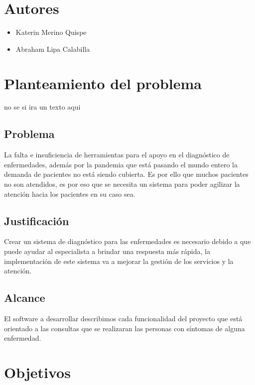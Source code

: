 \documentclass[preprint,12pt]{elsarticle}
\begin{document}
\section{Autores}
\begin{itemize}
    \item Katerin Merino Quispe
    \item Abraham Lipa Calabilla
    
\end{itemize}
\section{Planteamiento del problema}
no se si ira un texto aqui

	\subsection{\textbf{Problema}}
 La falta e insuficiencia de herramientas para el apoyo en el diagnóstico de enfermedades, además por la pandemia que está pasando el mundo entero la demanda de pacientes no está siendo cubierta. Es por ello que muchos pacientes no son atendidos, es por eso que se necesita un sistema para poder agilizar la atención hacia los pacientes en su caso sea.
	\subsection{\textbf{Justificación }}
Crear un sistema de diagnóstico para las enfermedades es necesario debido a que puede ayudar al especialista a brindar una respuesta más rápida, la implementación de este sistema va a mejorar la gestión de los servicios y la atención.

	\subsection{\textbf{ Alcance }}
El software a desarrollar describimos cada funcionalidad del proyecto que está orientado a las consultas que se realizaran las personas con síntomas de alguna enfermedad.

\section{Objetivos}
\end{document}
